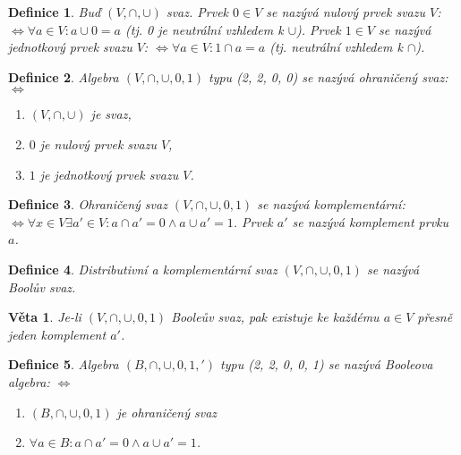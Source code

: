 \documentclass[a4paper, 11pt]{report}
\newtheorem{mydef}{Definice}[chapter]
\newtheorem{veta}{Věta}[chapter]
\begin{document}
\begin{mydef}
Buď $(V, \cap, \cup)$ svaz.
Prvek $0 \in V$ se nazývá \emph{nulový prvek svazu $V$}: $\Leftrightarrow \forall a \in V: a \cup 0 = a$ (tj. 0 je neutrální vzhledem k $\cup$).
Prvek $1 \in V$ se nazývá \emph{jednotkový prvek svazu $V$}: $\Leftrightarrow \forall a \in V: 1 \cap a = a$ (tj. neutrální vzhledem k $\cap$).
\end{mydef}

\begin{mydef}
Algebra $(V, \cap, \cup, 0, 1)$ typu (2, 2, 0, 0) se nazývá \emph{ohraničený svaz}: $\Leftrightarrow$
\begin{enumerate}[1)]
	\item $(V, \cap, \cup)$ je svaz,
	\item $0$ je nulový prvek svazu $V$,
	\item $1$ je jednotkový prvek svazu $V$.
\end{enumerate}
\end{mydef}

\begin{mydef}
Ohraničený svaz $(V, \cap, \cup, 0, 1)$ se nazývá komplementární: $\Leftrightarrow \forall x \in V \exists a' \in V: a \cap a' = 0 \land a \cup a' = 1$. Prvek $a'$ se nazývá \emph{komplement} prvku $a$.
\end{mydef}

\begin{mydef}
Distributivní a komplementární svaz $(V, \cap, \cup, 0, 1)$ se nazývá Boolův svaz.
\end{mydef}

\begin{veta}
Je-li $(V, \cap, \cup, 0, 1)$ Booleův svaz, pak existuje ke každému $a \in V$ přesně jeden komplement $a'$.
\end{veta}

\begin{mydef}
Algebra $(B, \cap, \cup, 0, 1, ')$ typu (2, 2, 0, 0, 1) se nazývá Booleova algebra: $\Leftrightarrow$
\begin{enumerate}[1)]
	\item $(B, \cap, \cup, 0, 1)$ je ohraničený svaz
	\item $\forall a \in B: a \cap a' = 0 \land a \cup a' = 1$.
\end{enumerate}
\end{mydef}
\end{document}
